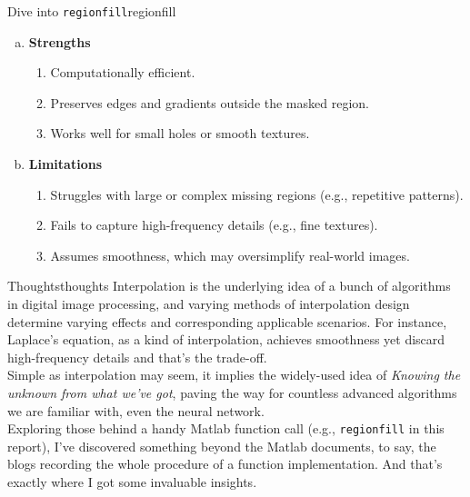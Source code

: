 \begin{problem}{Dive into \texttt{regionfill}}{regionfill}
\begin{enumerate}[(a)]
\begin{enumerate}[label = (\roman*)]
        \end{enumerate}
    \item \textbf{Strengths}
        \begin{enumerate}[label = (\roman*)]
            \item Computationally efficient.
            \item Preserves edges and gradients outside the masked region.
            \item Works well for small holes or smooth textures.
        \end{enumerate}
    \item \textbf{Limitations}
        \begin{enumerate}[label = (\roman*)]
            \item Struggles with large or complex missing regions (e.g., repetitive patterns).
            \item Fails to capture high-frequency details (e.g., fine textures).
            \item Assumes smoothness, which may oversimplify real-world images.
        \end{enumerate}

\end{enumerate}
\end{problem}

\begin{problem}{Thoughts}{thoughts}
    Interpolation is the underlying idea of a bunch of algorithms in digital image processing, and varying methods of interpolation design determine varying effects and corresponding applicable scenarios. For instance, Laplace's equation, as a kind of interpolation, achieves smoothness yet discard high-frequency details and that's the trade-off. \\
    Simple as interpolation may seem, it implies the widely-used idea of \textit{Knowing the unknown from what we've got}, paving the way for countless advanced algorithms we are familiar with, even the neural network.\\
    Exploring those behind a handy Matlab function call (e.g., \texttt{regionfill} in this report), I've discovered something beyond the Matlab documents, to say, the blogs recording the whole procedure of a function implementation. And that's exactly where I got some invaluable insights.
\end{problem}








